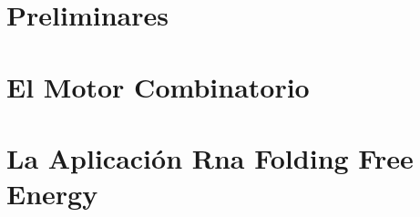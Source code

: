 \documentclass[a4paper,12pt,english]{report}
\theoremstyle{definition}
\begin{document}
\newpage
\nocite{*} 


\thispagestyle{empty}
\mbox{}
\part{Preliminares}

\thispagestyle{empty}
\mbox{}



\part{El Motor Combinatorio}

\thispagestyle{empty}
\mbox{}




\newpage
\thispagestyle{empty}
\mbox{}
\part{La Aplicaci\'on Rna Folding Free Energy}
\thispagestyle{empty}
\mbox{}




\appendix
\appendixpage
\newpage
\thispagestyle{empty}
\mbox{}
\addappheadtotoc




\end{document}
